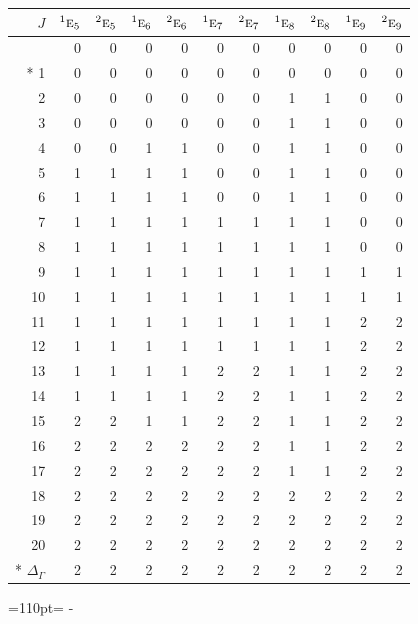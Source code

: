 \documentclass[10pt,a4paper]{article}
\makeatletter
\def\grouprule#1#2{\noalign{\marks\LTgroupmarks{\the\belowrulesep}\nobreak\vskip#1%
  \vskip\aboverulesep}\multispan\LT@cols\unskip{\leaders\hrule\@height#2\hfill\kern\z@}\cr
  \noalign{\penalty\LTrulebreak\vskip\belowrulesep\global\@lastruleclass\z@}}
\newcommand{\needspace}[1]{\par\penalty-100\begingroup\dimen0=#1\relax\dimen2=\pagegoal
  \advance\dimen2-\pagetotal\ifdim\dimen0>\dimen2\relax\ifdim\dimen2>0pt\vfil\break\fi\fi
  \endgroup}
\numberwithin{equation}{section}
\newcommand{\irr}[1]{\text{\normalfont\scshape #1}}
\newcommand{\conjpair}[1]{{}^{#1}}
\makeatother
\begin{document}
{\small\begin{longtable}{@{}rrrrrrrrrrr@{}}\toprule
$J$ & $\conjpair{1}\irr{e}_{5}$ & $\conjpair{2}\irr{e}_{5}$ & $\conjpair{1}\irr{e}_{6}$ & $\conjpair{2}\irr{e}_{6}$ & $\conjpair{1}\irr{e}_{7}$ & $\conjpair{2}\irr{e}_{7}$ & $\conjpair{1}\irr{e}_{8}$ & $\conjpair{2}\irr{e}_{8}$ & $\conjpair{1}\irr{e}_{9}$ & $\conjpair{2}\irr{e}_{9}$\\\midrule\endhead
\bottomrule\endfoot\endlastfoot
0 & 0 & 0 & 0 & 0 & 0 & 0 & 0 & 0 & 0 & 0\\*
1 & 0 & 0 & 0 & 0 & 0 & 0 & 0 & 0 & 0 & 0\\
2 & 0 & 0 & 0 & 0 & 0 & 0 & 1 & 1 & 0 & 0\\
3 & 0 & 0 & 0 & 0 & 0 & 0 & 1 & 1 & 0 & 0\\
4 & 0 & 0 & 1 & 1 & 0 & 0 & 1 & 1 & 0 & 0\\
5 & 1 & 1 & 1 & 1 & 0 & 0 & 1 & 1 & 0 & 0\\
6 & 1 & 1 & 1 & 1 & 0 & 0 & 1 & 1 & 0 & 0\\
7 & 1 & 1 & 1 & 1 & 1 & 1 & 1 & 1 & 0 & 0\\
8 & 1 & 1 & 1 & 1 & 1 & 1 & 1 & 1 & 0 & 0\\
9 & 1 & 1 & 1 & 1 & 1 & 1 & 1 & 1 & 1 & 1\\
10 & 1 & 1 & 1 & 1 & 1 & 1 & 1 & 1 & 1 & 1\\
11 & 1 & 1 & 1 & 1 & 1 & 1 & 1 & 1 & 2 & 2\\
12 & 1 & 1 & 1 & 1 & 1 & 1 & 1 & 1 & 2 & 2\\
13 & 1 & 1 & 1 & 1 & 2 & 2 & 1 & 1 & 2 & 2\\
14 & 1 & 1 & 1 & 1 & 2 & 2 & 1 & 1 & 2 & 2\\
15 & 2 & 2 & 1 & 1 & 2 & 2 & 1 & 1 & 2 & 2\\
16 & 2 & 2 & 2 & 2 & 2 & 2 & 1 & 1 & 2 & 2\\
17 & 2 & 2 & 2 & 2 & 2 & 2 & 1 & 1 & 2 & 2\\
18 & 2 & 2 & 2 & 2 & 2 & 2 & 2 & 2 & 2 & 2\\
19 & 2 & 2 & 2 & 2 & 2 & 2 & 2 & 2 & 2 & 2\\
20 & 2 & 2 & 2 & 2 & 2 & 2 & 2 & 2 & 2 & 2\\*
\grouprule{0pt}{\lightrulewidth} $\Delta_\Gamma$ & 2 & 2 & 2 & 2 & 2 & 2 & 2 & 2 & 2 & 2\\
\bottomrule\end{longtable}}
\needspace{110pt}
\end{document}
